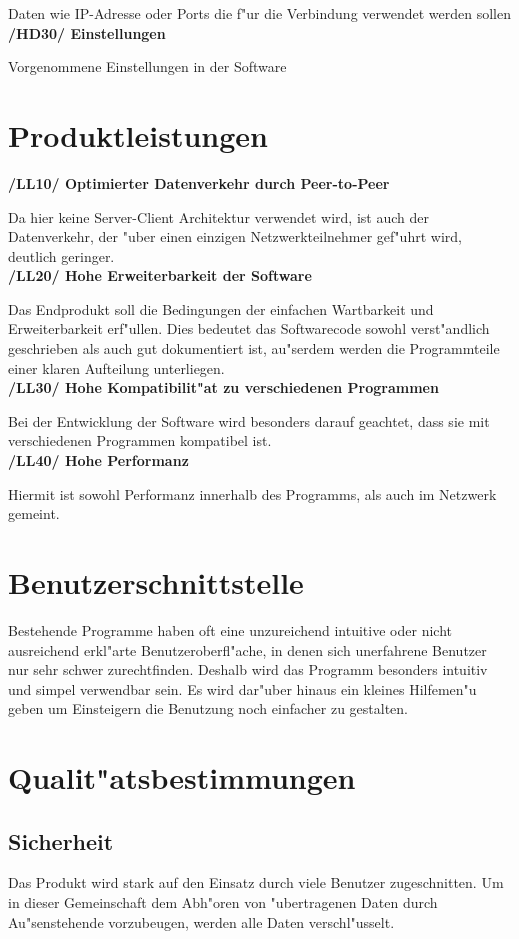 \documentclass[a4paper,12pt]{scrreprt}
\begin{document}
				Daten wie IP-Adresse oder Ports die f"ur die Verbindung verwendet werden sollen\\
				\textbf {/HD30/ Einstellungen}
				
				Vorgenommene Einstellungen in der Software\\

\chapter{Produktleistungen}
	\textbf{/LL10/ Optimierter Datenverkehr durch Peer-to-Peer}
			
			Da hier keine Server-Client Architektur verwendet wird, ist auch der Datenverkehr, der "uber einen einzigen Netzwerkteilnehmer gef"uhrt wird, deutlich geringer.\\
			\textbf {/LL20/ Hohe Erweiterbarkeit der Software}
			
			Das Endprodukt soll die Bedingungen der einfachen Wartbarkeit und Erweiterbarkeit erf"ullen. Dies bedeutet das Softwarecode sowohl verst"andlich geschrieben als auch gut dokumentiert ist, au"serdem werden die Programmteile einer klaren Aufteilung unterliegen.\\
			\textbf {/LL30/ Hohe Kompatibilit"at zu verschiedenen Programmen}
			
			Bei der Entwicklung der Software wird besonders darauf geachtet, dass sie mit verschiedenen Programmen kompatibel ist.\\
			\textbf {/LL40/ Hohe Performanz}
			
			Hiermit ist sowohl Performanz innerhalb des Programms, als auch im Netzwerk gemeint.
	
	
	
	
\chapter{Benutzerschnittstelle}
Bestehende Programme haben oft eine unzureichend intuitive oder nicht ausreichend erkl"arte Benutzeroberfl"ache, in denen sich unerfahrene Benutzer nur sehr schwer zurechtfinden. Deshalb wird das Programm besonders intuitiv und simpel verwendbar sein. Es wird dar"uber hinaus ein kleines Hilfemen"u geben um Einsteigern die Benutzung noch einfacher zu gestalten.
	
	
\chapter{Qualit"atsbestimmungen}
\section{Sicherheit}
	Das Produkt wird stark auf den Einsatz durch viele Benutzer zugeschnitten. Um in dieser Gemeinschaft dem Abh"oren von "ubertragenen Daten durch Au"senstehende vorzubeugen, werden alle Daten verschl"usselt.
		 
\end{document}
